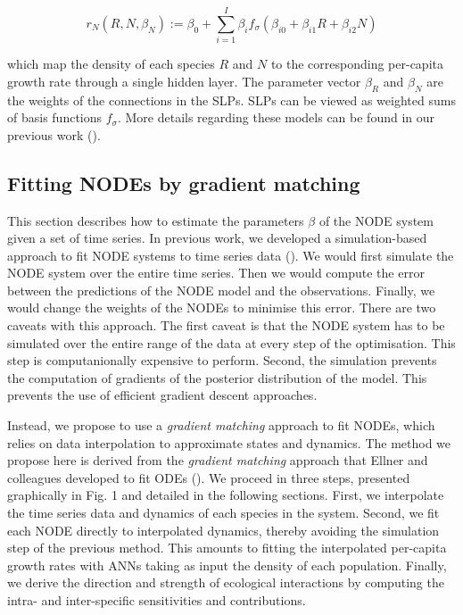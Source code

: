 \documentclass[11pt, oneside]{article}
\begin{document}
\begin{equation}
    r_N(R, N, \beta_N) := \beta_0 + \sum_{i=1}^{I} \beta_{i} f_{\sigma} \left( \beta_{i0} + \beta_{i1} R + \beta_{i2} N \right) 
\end{equation}

which map the density of each species $R$ and $N$ to the corresponding per-capita growth rate through a single hidden layer.
The parameter vector $\beta_R$ and $\beta_N$ are the weights of the connections in the SLPs.
SLPs can be viewed as weighted sums of basis functions $f_\sigma$.
More details regarding these models can be found in our previous work (\cite{Bonnaffe2021a}).

\subsection{Fitting NODEs by gradient matching}

This section describes how to estimate the parameters $\beta$ of the NODE system given a set of time series.
In previous work, we developed a simulation-based approach to fit NODE systems to time series data (\cite{Bonnaffe2021a}).
We would first simulate the NODE system over the entire time series.
Then we would compute the error between the predictions of the NODE model and the observations. 
Finally, we would change the weights of the NODEs to minimise this error. 
There are two caveats with this approach.
The first caveat is that the NODE system has to be simulated over the entire range of the data at every step of the optimisation.
This step is computanionally expensive to perform.
Second, the simulation prevents the computation of gradients of the posterior distribution of the model.
This prevents the use of efficient gradient descent approaches.

Instead, we propose to use a \textit{gradient matching} approach to fit NODEs, which relies on data interpolation to approximate states and dynamics.
The method we propose here is derived from the \textit{gradient matching} approach that Ellner and colleagues developed to fit ODEs (\cite{Ellner2002, Wu2005}).
We proceed in three steps, presented graphically in Fig. 1 and detailed in the following sections. 
First, we interpolate the time series data and dynamics of each species in the system. 
Second, we fit each NODE directly to interpolated dynamics, thereby avoiding the simulation step of the previous method. 
This amounts to fitting the interpolated per-capita growth rates with ANNs taking as input the density of each population.
Finally, we derive the direction and strength of ecological interactions by computing the intra- and inter-specific sensitivities and contributions.
\end{document}
